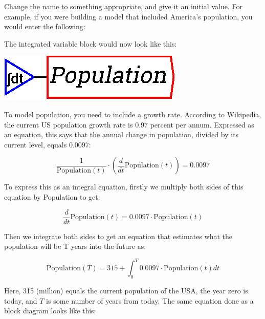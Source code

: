 \begin{description}
Change the name to something appropriate, and give it an initial
value. For example, if you were building a model that included
America's population, you would enter the following:

\begin{center}
\end{center}


The integrated variable block would now look like this:

\begin{center}
\includegraphics{images/NewItem42.eps}
\end{center}


To model population, you need to include a growth rate. According to
Wikipedia, the current US population growth rate is 0.97 percent per
annum.  Expressed as an equation, this says that the annual change in
population, divided by its current level, equals 0.0097: 

\begin{displaymath}
\frac{1}{\mathrm{Population}(t)}\cdot\left(\frac{d}{dt}\mathrm{Population}(t)\right)=0.0097
\end{displaymath}

To express this as an integral equation, firstly we multiply both
sides of this equation by Population to get:

\begin{displaymath}
\frac{d}{dt}\mathrm{Population}(t)=0.0097\cdot\mathrm{Population}(t)
\end{displaymath}

Then we integrate both sides to get an equation that estimates what
the population will be T years into the future as:

\begin{displaymath}
\mathrm{Population}(T)=315+\int_0^T 0.0097\cdot\mathrm{Population}(t)
dt
\end{displaymath}

Here, 315 (million) equals the current population of the USA, the year
zero is today, and $T$ is some number of years from today. The same
equation done as a block diagram looks like this: 

\begin{center}
\end{center}


\end{description}

